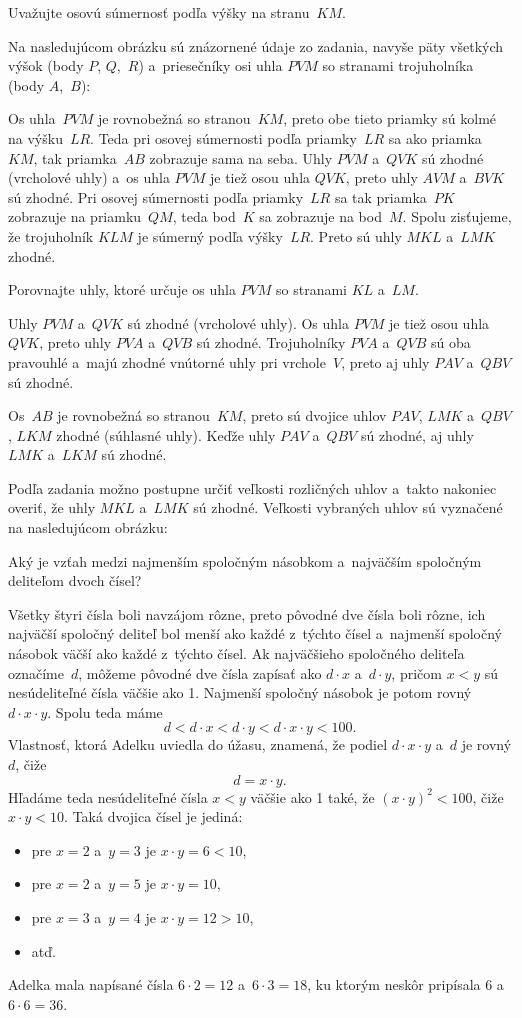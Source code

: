 {%
\napad
Uvažujte osovú súmernosť podľa výšky na stranu~$KM$.

\riesenie
Na nasledujúcom obrázku sú znázornené údaje zo zadania, navyše päty všetkých výšok (body $P$, $Q$,~$R$) a~priesečníky osi uhla $PV\!M$ so stranami trojuholníka (body $A$,~$B$):
%

Os uhla~$PVM$ je rovnobežná so stranou~$KM$, preto obe tieto priamky sú kolmé na výšku~$LR$.
Teda pri osovej súmernosti podľa priamky~$LR$ sa ako priamka~$KM$, tak priamka~$AB$ zobrazuje sama na seba.
Uhly $PV\!M$ a~$QV\!K$ sú zhodné (vrcholové uhly) a~os uhla $PV\!M$ je tiež osou uhla $QV\!K$,
preto uhly $AV\!M$ a~$BV\!K$ sú zhodné.
Pri osovej súmernosti podľa priamky~$LR$ sa tak priamka~$PK$ zobrazuje na priamku~$QM$, teda bod~$K$ sa zobrazuje na bod~$M$.
Spolu zisťujeme, že trojuholník $KLM$ je súmerný podľa výšky~$LR$.
Preto sú uhly $MKL$ a~$LMK$ zhodné.

\napadd
Porovnajte uhly, ktoré určuje os uhla $PV\!M$ so stranami $KL$ a~$LM$.

\ineriesenie
Uhly $PV\!M$ a~$QV\!K$ sú zhodné (vrcholové uhly).
Os uhla $PVM$ je tiež osou uhla $QVK$, preto uhly $PV\!A$ a~$QVB$ sú zhodné.
Trojuholníky $PVA$ a~$QVB$ sú oba pravouhlé a~majú zhodné vnútorné uhly
pri vrchole~$V$, preto aj uhly $PAV$ a~$QBV$ sú zhodné.

Os~$AB$ je rovnobežná so stranou~$KM$, preto sú dvojice uhlov $PAV$,
$LMK$ a~$QBV$, $LKM$ zhodné (súhlasné uhly).
Keďže uhly $PAV$ a~$QBV$ sú zhodné, aj uhly $LMK$ a~$LKM$ sú zhodné.

\poznamka
Podľa zadania možno postupne určiť veľkosti rozličných uhlov a~takto nakoniec overiť, že uhly $MKL$ a~$LMK$ sú zhodné.
Veľkosti vybraných uhlov sú vyznačené na nasledujúcom obrázku:
%


}

{%
\napad
Aký je vzťah medzi najmenším spoločným násobkom a~najväčším spoločným deliteľom dvoch čísel?

\riesenie
Všetky štyri čísla boli navzájom rôzne, preto pôvodné dve čísla boli rôzne,
ich najväčší spoločný deliteľ bol menší ako každé z~týchto čísel a~najmenší spoločný násobok väčší ako každé z~týchto čísel.
Ak najväčšieho spoločného deliteľa označíme~$d$, môžeme pôvodné dve čísla zapísať ako $d\cdot x$ a~$d\cdot y$, pričom $x<y$ sú nesúdeliteľné čísla väčšie ako 1.
Najmenší spoločný násobok je potom rovný $d\cdot x\cdot y$.
Spolu teda máme
$$
d<d\cdot x<d\cdot y<d\cdot x\cdot y<100.
$$
Vlastnosť, ktorá Adelku uviedla do úžasu, znamená, že podiel $d\cdot x\cdot y$ a~$d$ je rovný $d$, čiže
$$
d=x\cdot y.
$$
Hľadáme teda nesúdeliteľné čísla $x<y$ väčšie ako 1 také, že $(x\cdot y)^2<100$, čiže $x\cdot y<10$.
Taká dvojica čísel je jediná:
\begin{itemize}
\item pre $x=2$ a~$y=3$ je $x\cdot y=6<10$,
\item pre $x=2$ a~$y=5$ je $x\cdot y=10$,
\item pre $x=3$ a~$y=4$ je $x\cdot y=12>10$,
\item atď.
\end{itemize}
Adelka mala napísané čísla $6\cdot2=12$ a~$6\cdot 3=18$, ku ktorým neskôr pripísala 6 a~$6\cdot 6=36$.
}


